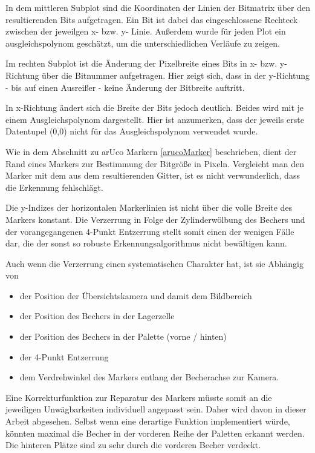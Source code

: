     In dem mittleren Subplot sind die Koordinaten der Linien der Bitmatrix über den resultierenden Bits aufgetragen. 
    Ein Bit ist dabei das eingeschlossene Rechteck zwischen der jeweilgen x- bzw. y- Linie. 
    Außerdem wurde für jeden Plot ein ausgleichspolynom geschätzt, um die unterschiedlichen Verläufe zu zeigen. 
    
    Im rechten Subplot ist die Änderung der Pixelbreite eines Bits in x- bzw. y- Richtung über die Bitnummer aufgetragen.
    Hier zeigt sich, dass in der y-Richtung - bis auf einen Ausreißer - keine Änderung der Bitbreite auftritt. 
    
    In x-Richtung ändert sich die Breite der Bits jedoch deutlich.
    Beides wird mit je einem Ausgleichspolynom dargestellt. 
    Hier ist anzumerken, dass der jeweils erste Datentupel (0,0) nicht für das Ausgleichspolynom verwendet wurde. 

    Wie in dem Abschnitt zu arUco Markern \ref{arucoMarker} beschrieben, dient der Rand eines Markers zur Bestimmung der Bitgröße in Pixeln.
    Vergleicht man den Marker mit dem aus dem resultierenden Gitter, ist es nicht verwunderlich, dass die Erkennung fehlschlägt.

    Die y-Indizes der horizontalen Markerlinien ist nicht über die volle Breite des Markers konstant. 
    Die Verzerrung in Folge der Zylinderwölbung des Bechers und der vorangegangenen 4-Punkt Entzerrung stellt somit einen der wenigen Fälle dar, 
    die der sonst so robuste Erkennungsalgorithmus nicht bewältigen kann.

    Auch wenn die Verzerrung einen systematischen Charakter hat, ist sie Abhängig von
    \begin{itemize}
        \item der Position der Übersichtskamera und damit dem Bildbereich
        \item der Position des Bechers in der Lagerzelle
        \item der Position des Bechers in der Palette (vorne / hinten)
        \item der 4-Punkt Entzerrung
        \item dem Verdrehwinkel des Markers entlang der Becherachse zur Kamera.
    \end{itemize}

    Eine Korrekturfunktion zur Reparatur des Markers müsste somit an die jeweiligen Unwägbarkeiten individuell angepasst sein.
    Daher wird davon in dieser Arbeit abgesehen. 
    Selbst wenn eine derartige Funktion implementiert würde, könnten maximal die Becher in der vorderen Reihe der Paletten erkannt werden.
    Die hinteren Plätze sind zu sehr durch die vorderen Becher verdeckt.

